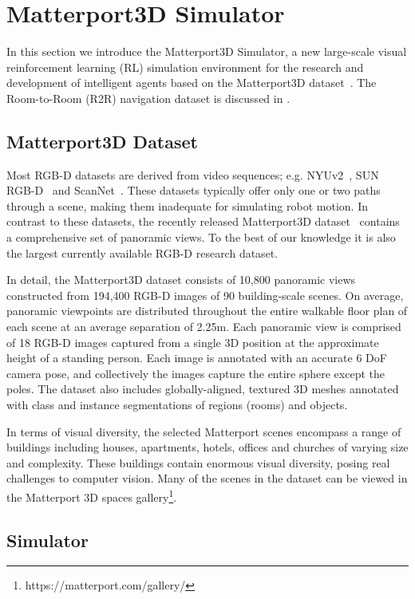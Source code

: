 \documentclass[10pt,twocolumn,letterpaper]{article}
\begin{document}
\section{Matterport3D Simulator}
\label{sec:sim}

In this section we introduce the Matterport3D Simulator, a new large-scale visual reinforcement learning (RL) simulation environment for the research and development of intelligent agents based on the Matterport3D dataset~\cite{Matterport3D}. The Room-to-Room (R2R) navigation dataset is discussed in .

\subsection{Matterport3D Dataset}

Most RGB-D datasets are derived from video sequences; e.g. NYUv2~\cite{NYUv2}, SUN RGB-D~\cite{SUNrgbd} and ScanNet~\cite{dai2017scannet}. These datasets typically offer only one or two paths through a scene, making them inadequate for simulating robot motion. In contrast to these datasets, the recently released Matterport3D dataset~\cite{Matterport3D} contains a comprehensive set of panoramic views. To the best of our knowledge it is also the largest currently available RGB-D research dataset.

In detail, the Matterport3D dataset consists of 10,800 panoramic views constructed from 194,400 RGB-D images of 90 building-scale scenes. On average, panoramic viewpoints are distributed throughout the entire walkable floor plan of each scene at an average separation of 2.25m. Each panoramic view is comprised of 18 RGB-D images captured from a single 3D position at the approximate height of a standing person. Each image is annotated with an accurate 6 DoF camera pose, and collectively the images capture the entire sphere except the poles. The dataset also includes globally-aligned, textured 3D meshes annotated with class and instance segmentations of regions (rooms) and objects. 

In terms of visual diversity, the selected Matterport scenes encompass a range of buildings including houses, apartments, hotels, offices and churches of varying size and complexity. These buildings contain enormous visual diversity, posing real challenges to computer vision. Many of the scenes in the dataset can be viewed in the Matterport 3D spaces gallery\footnote{https://matterport.com/gallery/}. 

\subsection{Simulator}
\label{sec:simsub}
\end{document}
